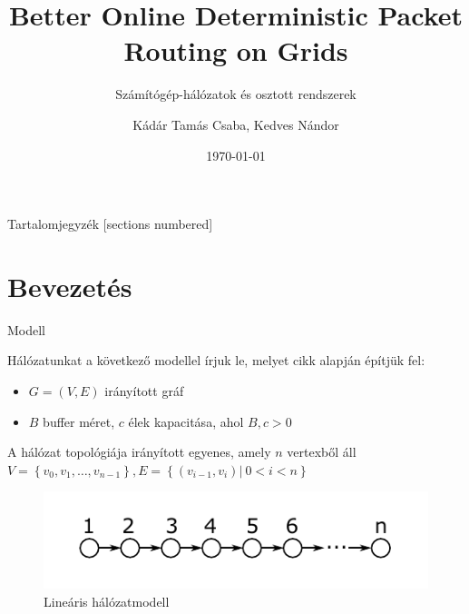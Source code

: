\documentclass[10pt]{beamer}
\title{Better Online Deterministic Packet Routing on Grids}
\subtitle{Számítógép-hálózatok és osztott rendszerek}
\date{\today}
\author{Kádár Tamás Csaba, Kedves Nándor}
\begin{document}
\maketitle

\begin{frame}{Tartalomjegyzék}
  [sections numbered]
  \tableofcontents[hideallsubsections]
\end{frame}

\section{Bevezetés}

\begin{frame}[fragile]{Modell}

  Hálózatunkat a következő modellel írjuk le, melyet \cite{even2015better} cikk alapján építjük fel:
  \begin{itemize}
  	\item $ G = \left( V, E \right) $ irányított gráf
  	\item $ B $ buffer méret, $ c $ élek kapacitása, ahol $ B, c > 0 $
  \end{itemize}

  A hálózat topológiája irányított egyenes, amely $ n $ vertexből áll $ V = \left\lbrace v_0, v_1,\dots,v_{n-1} \right\rbrace, E = \left\lbrace \left( v_{i-1}, v_i \right) | \ 0 < i < n \right\rbrace $

  \begin{figure}[c]
  	\centering \includegraphics[width=1\columnwidth]{Image/linear_network}
  	\caption{\label{fig:linear_network}Lineáris hálózatmodell}
  \end{figure}

\end{frame}
\end{document}
